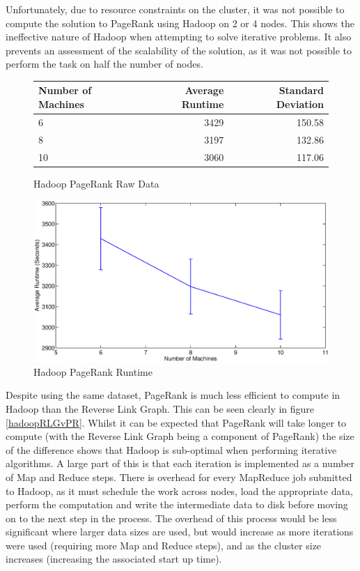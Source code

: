 Unfortunately, due to resource constraints on the cluster, it was not possible to compute the solution to PageRank using Hadoop on 2 or 4 nodes. This shows the ineffective nature of Hadoop when attempting to solve iterative problems. It also prevents an assessment of the scalability of the solution, as it was not possible to perform the task on half the number of nodes.

\begin{figure}[H]
\centering
	\begin{tabular}{lrr}
		\toprule
		Number of Machines & Average Runtime & Standard Deviation \\
		\midrule

		6 & 3429 & 150.58 \\
		8 & 3197 & 132.86 \\
		10 & 3060 & 117.06 \\
		\bottomrule
	\end{tabular}
	\caption{Hadoop PageRank Raw Data}
\end{figure}

\begin{figure}[H]
	\centering
	\includegraphics[scale=0.6]{resources/HadoopPR.eps}
	\caption{Hadoop PageRank Runtime}
\end{figure}

Despite using the same dataset, PageRank is much less efficient to compute in Hadoop than the Reverse Link Graph. This can be seen clearly in figure \ref{hadoopRLGvPR}. Whilst it can be expected that PageRank will take longer to compute (with the Reverse Link Graph being a component of PageRank) the size of the difference shows that Hadoop is sub-optimal when performing iterative algorithms. A large part of this is that each iteration is implemented as a number of Map and Reduce steps. There is overhead for every MapReduce job submitted to Hadoop, as it must schedule the work across nodes, load the appropriate data, perform the computation and write the intermediate data to disk before moving on to the next step in the process. The overhead of this process would be less significant where larger data sizes are used, but would increase as more iterations were used (requiring more Map and Reduce steps), and as the cluster size increases (increasing the associated start up time). 

